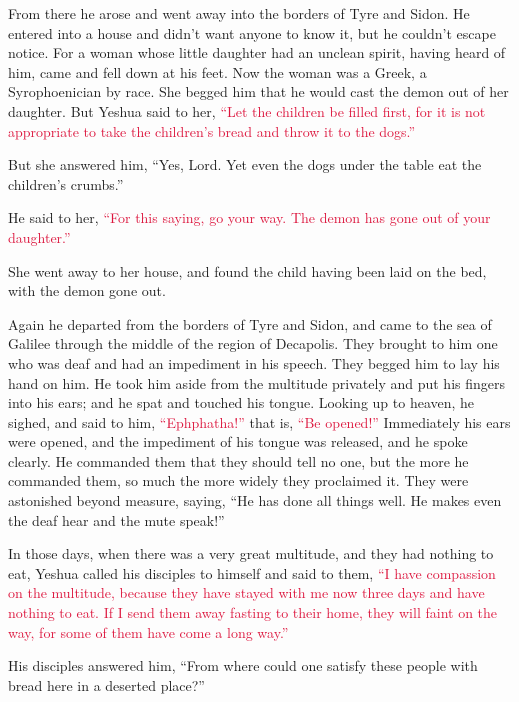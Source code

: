 \myverse{}From there he arose and went away into the borders of Tyre and
Sidon. He entered into a house and didn’t want anyone to know it, but he couldn’t escape notice.
\myverse{}For a woman whose little daughter had an unclean spirit, having heard of him,
came and fell down at his feet.
\myverse{}Now the woman was a Greek, a Syrophoenician by race. She begged him that he
would cast the demon out of her daughter.
\myverse{}But Yeshua said to her,
\textcolor{crimson}{“Let the children be filled first, for it is not appropriate to take the children’s bread and throw
	it to the dogs.”
}

\myverse{}But she answered him, “Yes, Lord. Yet even the dogs under the
table eat the children’s crumbs.”

\myverse{}He said to her,
\textcolor{crimson}{“For this saying, go your way. The demon has gone out of your daughter.”}

\myverse{}She went away to her house, and found the child having been laid
on the bed, with the demon gone out.

\myverse{}Again he departed from the borders of Tyre and Sidon, and came
to the sea of Galilee through the middle of the region of Decapolis.
\myverse{}They brought to him one who was deaf and had an impediment in his speech.
They begged him to lay his hand on him.
\myverse{}He took him aside from the multitude privately and put his fingers into his
ears; and he spat and touched his tongue.
\myverse{}Looking up to heaven, he sighed, and said to him,
\textcolor{crimson}{“Ephphatha!”
} that is,
\textcolor{crimson}{“Be opened!”}
\myverse{}Immediately his ears were opened, and the impediment of his tongue was released,
and he spoke clearly.
\myverse{}He commanded them that they should tell no one, but the more he commanded
them, so much the more widely they proclaimed it.
\myverse{}They were astonished beyond measure, saying, “He has done all things well.
He makes even the deaf hear and the mute speak!”


\mychapter{} \myverse*{}In those days, when there was a very great multitude, and they
had nothing to eat, Yeshua called his disciples to himself and said to them,
\myverse{}\textcolor{crimson}{“I have compassion on the multitude, because they have stayed with me now
	three days and have nothing to eat.
}
\myverse{}\textcolor{crimson}{If I send them away fasting to their home, they will faint on the way, for
	some of them have come a long way.”}

\myverse{}His disciples answered him, “From where could one satisfy these
people with bread here in a deserted place?”

